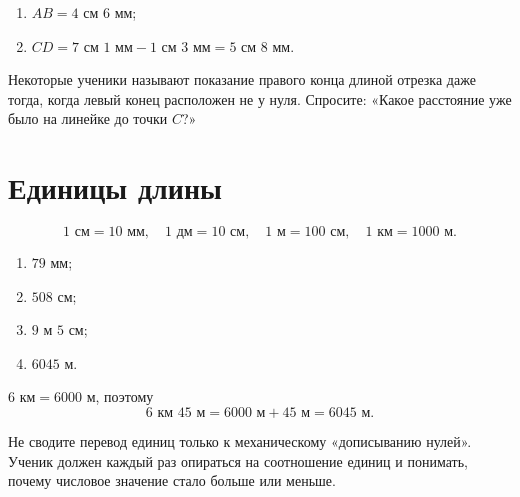 \readrulerpracticefigure

\begin{practicebox}
  \begin{enumerate}[label=\alph*),itemsep=0.4em]
    \item \(AB=4\text{ см }6\text{ мм}\);
    \item \(CD=7\text{ см }1\text{ мм}-1\text{ см }3\text{ мм}
      =5\text{ см }8\text{ мм}\).
  \end{enumerate}
\end{practicebox}

\begin{teacherbox}
  Некоторые ученики называют показание правого конца длиной отрезка даже
  тогда, когда левый конец расположен не у нуля. Спросите: «Какое расстояние
  уже было на линейке до точки \(C\)?»
\end{teacherbox}

\section{Единицы длины}

\unitsladderfigure

\begin{propertybox}[Ответы]
  \[
    1\text{ см}=10\text{ мм},\quad
    1\text{ дм}=10\text{ см},\quad
    1\text{ м}=100\text{ см},\quad
    1\text{ км}=1000\text{ м}.
  \]
\end{propertybox}

\begin{practicebox}
  \begin{enumerate}[label=\alph*),itemsep=0.45em]
    \item \(79\text{ мм}\);
    \item \(508\text{ см}\);
    \item \(9\text{ м }5\text{ см}\);
    \item \(6045\text{ м}\).
  \end{enumerate}
\end{practicebox}

\begin{warningbox}
  \(6\text{ км}=6000\text{ м}\), поэтому
  \[
    6\text{ км }45\text{ м}=6000\text{ м}+45\text{ м}=6045\text{ м}.
  \]
\end{warningbox}

\begin{teacherbox}
  Не сводите перевод единиц только к механическому «дописыванию нулей».
  Ученик должен каждый раз опираться на соотношение единиц и понимать,
  почему числовое значение стало больше или меньше.
\end{teacherbox}

